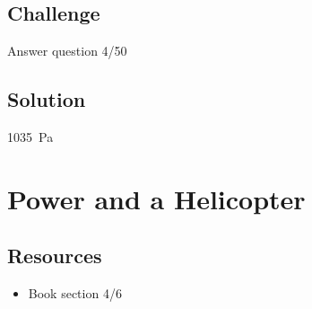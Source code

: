 \subsection*{Challenge}
Answer question 4/50

\subsection*{Solution}
\SI{1035}{\pascal}




%
%
%
%
%
%
%



\newpage
\section{Power and a Helicopter}

\subsection*{Resources}
\begin{itemize}
    \item Book section 4/6
\end{itemize}

